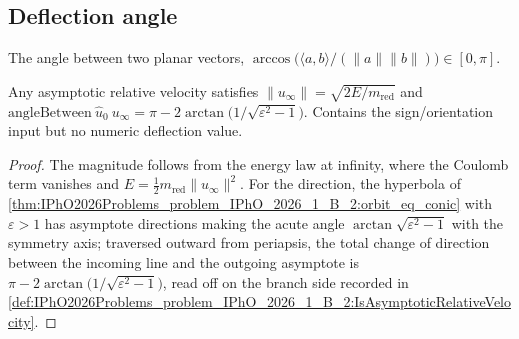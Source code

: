 \subsection*{Deflection angle}

\begin{definition}
\label{def:IPhO2026Problems_problem_IPhO_2026_1_B_2:angleBetween}
The angle between two planar vectors,
$\arccos\!\big(\langle a, b\rangle / (\lVert a \rVert \lVert b
\rVert)\big) \in [0, \pi]$.
\end{definition}

\begin{theorem}
\label{thm:IPhO2026Problems_problem_IPhO_2026_1_B_2:signed_deflection_eq_formula}
Any asymptotic relative velocity satisfies
$\lVert u_\infty \rVert = \sqrt{2E/m_{\mathrm{red}}}$ and
$\mathrm{angleBetween}\ \hat u_0\ u_\infty
= \pi - 2\arctan\!\big(1/\sqrt{\varepsilon^2 - 1}\big)$.
Contains the sign/orientation input but no numeric deflection value.
\end{theorem}
\begin{proof}
The magnitude follows from the energy law at infinity, where the Coulomb
term vanishes and $E = \tfrac12 m_{\mathrm{red}} \lVert u_\infty \rVert^2$.
For the direction, the hyperbola of
\cref{thm:IPhO2026Problems_problem_IPhO_2026_1_B_2:orbit_eq_conic} with
$\varepsilon > 1$ has asymptote directions making the acute angle
$\arctan\sqrt{\varepsilon^2 - 1}$ with the symmetry axis; traversed outward
from periapsis, the total change of direction between the incoming line and
the outgoing asymptote is
$\pi - 2\arctan\!\big(1/\sqrt{\varepsilon^2-1}\big)$, read off on the
branch side recorded in
\cref{def:IPhO2026Problems_problem_IPhO_2026_1_B_2:IsAsymptoticRelativeVelocity}.
\end{proof}

